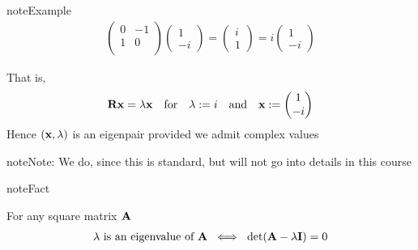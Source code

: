 \documentclass[letterpaper,10pt,english]{jupyterBook}
\begin{document}
\begin{sphinxadmonition}{note}{Example}
\begin{equation*}
\begin{split}
%
\left(
\begin{array}{cc}
0 & -1 \\
1 & 0 \\
\end{array}
\right)
\begin{pmatrix}
1 \\
-i
\end{pmatrix}
=
\begin{pmatrix}
i \\
1
\end{pmatrix}
=
i
\begin{pmatrix}
1 \\
-i
\end{pmatrix}
%
\end{split}
\end{equation*}\end{sphinxadmonition}

\sphinxAtStartPar
That is,
\begin{equation*}
\begin{split}
%
{\bf R} {\bf x} = \lambda {\bf x}
\quad \text{for} \quad
\lambda := i
\quad \text{and} \quad
{\bf x} := 
\begin{pmatrix}
1 \\
-i
\end{pmatrix}
%
\end{split}
\end{equation*}
\sphinxAtStartPar
Hence \(({\bf x}, \lambda)\) is an eigenpair provided we admit complex values

\begin{sphinxadmonition}{note}{Note:}
\sphinxAtStartPar
We do, since this is standard, but will not go into details in this course
\end{sphinxadmonition}

\begin{sphinxadmonition}{note}{Fact}

\sphinxAtStartPar
For any square matrix \({\bf A}\)
\begin{equation*}
\begin{split}
%
\lambda \text{ is an eigenvalue of } {\bf A} \; \iff \;
\det({\bf A} - \lambda {\bf I}) = 0
%
\end{split}
\end{equation*}\end{sphinxadmonition}
\end{document}
